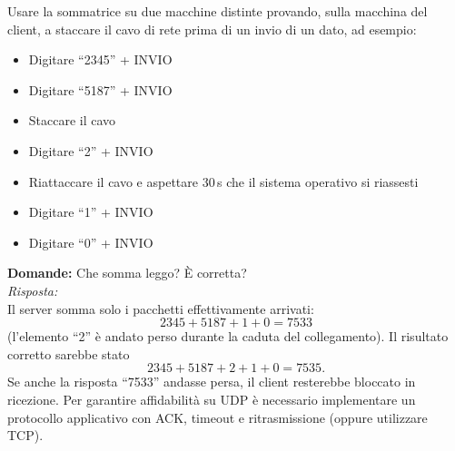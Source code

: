 \documentclass[a4paper,12pt]{article}
\begin{document}
Usare la sommatrice su due macchine distinte provando, sulla macchina del client, a staccare il cavo di rete prima di un invio di un dato, ad esempio:
\begin{itemize}
  \item Digitare “2345” + INVIO
  \item Digitare “5187” + INVIO
  \item Staccare il cavo
  \item Digitare “2” + INVIO
  \item Riattaccare il cavo e aspettare 30\,s che il sistema operativo si riassesti
  \item Digitare “1” + INVIO
  \item Digitare “0” + INVIO
\end{itemize}
\textbf{Domande:} Che somma leggo? È corretta?\\
\emph{Risposta:}\\
Il server somma solo i pacchetti effettivamente arrivati: 
\[2345 + 5187 + 1 + 0 = 7533\]
(l'elemento “2” è andato perso durante la caduta del collegamento). 
Il risultato corretto sarebbe stato 
\[2345 + 5187 + 2 + 1 + 0 = 7535.\]
Se anche la risposta “7533” andasse persa, il client resterebbe bloccato in ricezione. 
Per garantire affidabilità su UDP è necessario implementare un protocollo applicativo con ACK, timeout e ritrasmissione (oppure utilizzare TCP).
\end{document}
